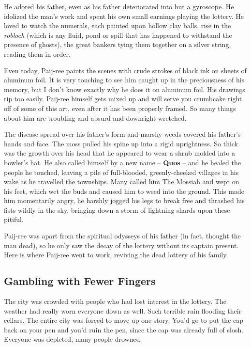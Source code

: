 \documentclass[10pt,twoside]{report}
\begin{document}
He adored his father, even as his father deteriorated into but a
gyroscope.  He idolized the man's work and spent his own small
earnings playing the lottery.  He loved to watch the numerals, each
painted upon hollow clay balls, rise in the {\em robloch} (which is
any fluid, pond or spill that has happened to withstand the presence
of ghosts), the great bankers tying them together on a silver string,
reading them in order.

Even today, Paij-ree paints the scenes with crude strokes of black ink
on sheets of aluminum foil.  It is very touching to see him caught up
in the preciousness of his memory, but I don't know exactly why he
does it on aluminum foil.  His drawings rip too easily.  Paij-ree
himself gets mixed up and will serve you crumbcake right off of some
of this art, even after it has been properly framed.  So many things
about him are troubling and absurd and downright wretched.

The disease spread over his father's form and marshy weeds covered his
father's hands and face.  The moss pulled his spine up into a rigid
uprightness.  So thick was the growth over his head that he appeared
to wear a shrub molded into a bowler's hat.  He also called himself by
a new name -- {\bf Quos} -- and he healed the people he touched,
leaving a pile of full-blooded, greenly-cheeked villages in his wake
as he travelled the townships.  Many called him The Mossiah and wept
on his feet, which wet the buds and caused him to weed into the
ground.  This made him momentarily angry, he harshly jogged his legs
to break free and thrashed his fists wildly in the sky, bringing down
a storm of lightning shards upon these pitiful.

Paij-ree was apart from the spiritual odysseys of his father (in fact,
thought the man dead), so he only saw the decay of the lottery without
its captain present.  Here is where Paij-ree went to work, reviving
the dead lottery of his family.



\subsection{Gambling with Fewer Fingers}



The city was crowded with people who had lost interest in the lottery.
The weather had really worn everyone down as well.  Such terrible rain
flooding their cellars. The entire city was forced to move up one
story.  You'd go to put the cap back on your pen and you'd ruin the
pen, since the cap was already full of slosh.  Everyone was depleted,
many people drowned.
\end{document}
